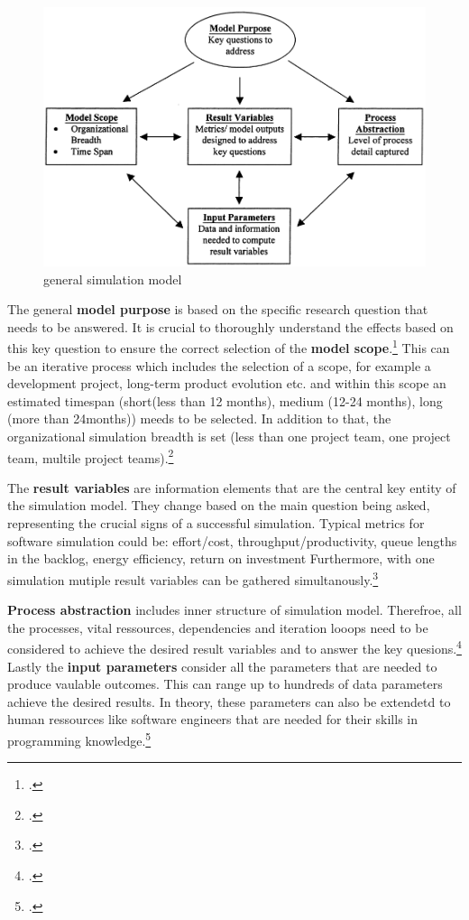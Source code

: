 \begin{figure}[H]
    \centering
    \includegraphics[width=0.7\linewidth]{graphics/Simulation_Modell.png}
    \caption{general simulation model\protect\footnotemark}
    \label{simulation_Modell}
\end{figure}

The general \textbf{model purpose} is based on the specific research question that needs to be answered.
It is crucial to thoroughly understand the effects based on this key question to ensure the correct selection of the \textbf{model scope}.\footcite[cf.][95]{kellnerSoftwareProcessSimulation1999}
This can be an iterative process which includes the selection of a scope, for example a development project, long-term product evolution etc. and within 
this scope an estimated timespan (short(less than 12 months), medium (12-24 months), long (more than 24months)) meeds to be selected. 
In addition to that, the organizational simulation breadth is set (less than one project team, one project team, multile project teams).\footcite[cf.][96]{kellnerSoftwareProcessSimulation1999}

The \textbf{result variables} are information elements that are the central key entity of the simulation model. 
They change based on the main question being asked, representing the crucial signs of a successful simulation.
Typical metrics for software simulation could be: effort/cost, throughput/productivity, queue lengths in the backlog,
energy efficiency, return on investment
Furthermore, with one simulation mutiple result variables can be gathered simultanously.\footcite[cf.][96-97]{kellnerSoftwareProcessSimulation1999}

\textbf{Process abstraction} includes inner structure of simulation model.
Therefroe, all the processes, vital ressources, dependencies and iteration looops need to be considered to achieve the desired result variables and to answer the key quesions.\footcite[cf.][97]{kellnerSoftwareProcessSimulation1999}
Lastly the \textbf{input parameters} consider all the parameters that are needed to produce vaulable outcomes. 
This can range up to hundreds of data parameters achieve the desired results. 
In theory, these parameters can also be extendetd to human ressources like software engineers that are needed for their skills in programming knowledge.\footcite[cf.][97]{kellnerSoftwareProcessSimulation1999}

